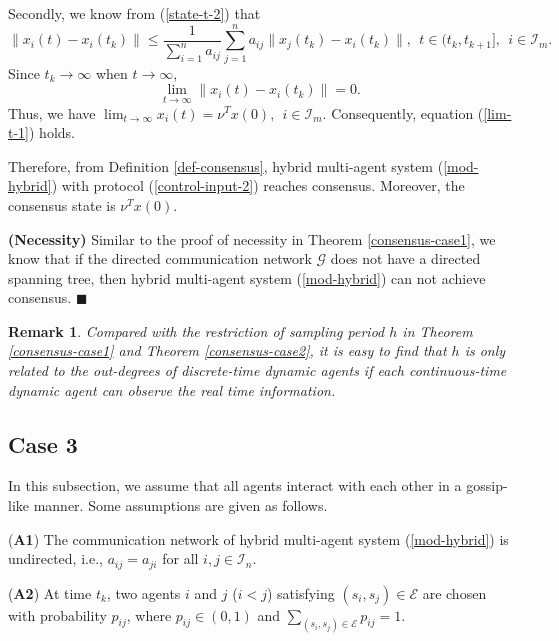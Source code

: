 \documentclass[12pt,draftcls,onecolumn]{IEEEtran}
\newtheorem{remark}{Remark}
\begin{document}
Secondly, we know from (\ref{state-t-2}) that
\[
\|x_i(t)-x_i(t_k)\|\leq\frac{1}{\sum_{i=1}^na_{ij}}\sum_{j=1}^na_{ij}\|x_j(t_k)-x_i(t_k)\|, ~~t\in (t_k,t_{k+1}],~~i\in \mathcal{I}_m.
\]
Since $t_k\rightarrow \infty$ when $t\rightarrow \infty$,
\[
\lim_{t\rightarrow \infty}\|x_i(t)-x_i(t_k)\|=0.
\]
Thus, we have
$\lim_{t\rightarrow \infty}x_i(t)=\nu^T x(0),~~i\in\mathcal{I}_{m}.$
Consequently, equation (\ref{lim-t-1}) holds.

Therefore, from Definition \ref{def-consensus}, hybrid multi-agent system (\ref{mod-hybrid}) with protocol (\ref{control-input-2}) reaches consensus. Moreover, the consensus state is $\nu^T x(0)$.


\textbf{(Necessity)} Similar to the proof of necessity in Theorem \ref{consensus-case1}, we know that if the directed communication network $\mathscr{G}$ does not have a directed spanning tree, then hybrid multi-agent system (\ref{mod-hybrid}) can not achieve consensus. $\blacksquare$

\begin{remark}\label{h}
Compared with the restriction of sampling period $h$ in Theorem \ref{consensus-case1} and Theorem \ref{consensus-case2}, it is easy to find that $h$ is only related to the out-degrees of discrete-time dynamic agents if each continuous-time dynamic agent can observe the real time information.
\end{remark}


\subsection{Case 3}\label{s-case3}

In this subsection, we assume that all agents interact with each other in a gossip-like manner. Some assumptions are given as follows.

(\textbf{A1}) The communication network of hybrid multi-agent system (\ref{mod-hybrid}) is undirected, i.e., $a_{ij}=a_{ji}$ for all $i,j\in \mathcal{I}_n$.

(\textbf{A2}) At time $t_k$, two agents $i$ and $j$ ($i<j$) satisfying $(s_i,s_j)\in \mathscr{E}$ are chosen with probability $p_{ij}$, where $p_{ij}\in (0,1)$ and $\sum_{(s_i,s_j)\in \mathscr{E}} p_{ij}=1$.
\end{document}
